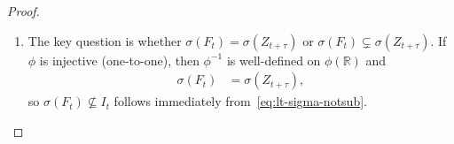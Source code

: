 \documentclass[12pt,openany]{book}
\newcommand{\calI}{\mathcal{I}}
\numberwithin{equation}{chapter}
\theoremstyle{plain}
\theoremstyle{definition}
\theoremstyle{remark}
\numberwithin{equation}{chapter}
\theoremstyle{plain}
\def\calI{I}%
\begin{document}
\begin{proof}
\begin{enumerate}
        \begin{enumerate}
          \item \emph{Sub-case~(a): $\phi^{-1}(\phi(B^*))$ is
                non-trivial.}  If there exists
                $C^* \in \mathcal{B}(\mathbb{R})$ such that
                $B^* \subseteq \phi^{-1}(C^*)$, then
                \begin{align}
                  Z_{t+\tau}^{-1}(B^*)
                    &\subseteq Z_{t+\tau}^{-1}(\phi^{-1}(C^*))
                     = F_t^{-1}(C^*).
                  \label{eq:lt-containment}
                \end{align}
                If $F_t$ were $\calI_t$-measurable, then
                $F_t^{-1}(C^*) \in \calI_t$, and since
                $Z_{t+\tau}^{-1}(B^*) \subseteq F_t^{-1}(C^*)$,
                we cannot directly conclude
                $Z_{t+\tau}^{-1}(B^*) \in \calI_t$ from
                containment alone.  We proceed differently.

          \item \emph{Sub-case~(b): Direct sigma-algebra
                comparison.}  Since $F_t = \phi(Z_{t+\tau})$,
                for every $C \in \mathcal{B}(\mathbb{R})$,
                \begin{align}
                  F_t^{-1}(C)
                    &= \{\omega : \phi(Z_{t+\tau}(\omega)) \in C\}
                     = Z_{t+\tau}^{-1}(\phi^{-1}(C)).
                  \label{eq:lt-preimage}
                \end{align}
                Hence $\sigma(F_t) \subseteq \sigma(Z_{t+\tau})$
                (since every generator of $\sigma(F_t)$ is a
                generator of $\sigma(Z_{t+\tau})$ via
                $\phi^{-1}(C) \in \mathcal{B}(\mathbb{R})$).
        \end{enumerate}

  \item The key question is whether $\sigma(F_t) = \sigma(Z_{t+\tau})$
        or $\sigma(F_t) \subsetneq \sigma(Z_{t+\tau})$.  If $\phi$
        is injective (one-to-one), then $\phi^{-1}$ is
        well-defined on $\phi(\mathbb{R})$ and
        \begin{align}
          \sigma(F_t) &= \sigma(Z_{t+\tau}),
          \label{eq:lt-sigma-equal}
        \end{align}
        so $\sigma(F_t) \not\subseteq \calI_t$ follows immediately
        from~\eqref{eq:lt-sigma-notsub}.


\end{enumerate}
\end{proof}
\end{document}
